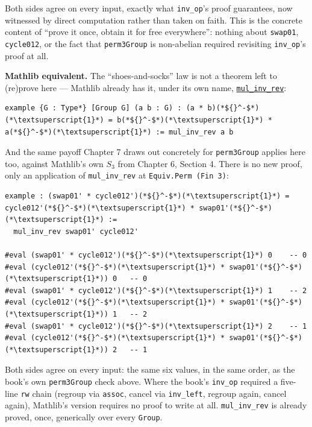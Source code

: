 Both sides agree on every input, exactly what \texttt{inv\_\allowbreak{}op}'s proof guarantees, now witnessed by direct computation rather than taken on faith. This is the concrete content of ``prove it once, obtain it for free everywhere'': nothing about \texttt{swap01}, \texttt{cycle012}, or the fact that \texttt{perm3Group} is non-abelian required revisiting \texttt{inv\_\allowbreak{}op}'s proof at all.

\textbf{Mathlib equivalent.} The ``shoes-and-socks'' law is not a theorem left to (re)prove here --- Mathlib already has it, under its own name, \href{https://loogle.lean-lang.org/?q=mul_inv_rev}{\texttt{mul\_\allowbreak{}inv\_\allowbreak{}rev}}:

\begin{lstlisting}
example {G : Type*} [Group G] (a b : G) : (a * b)(*${}^-$*)(*\textsuperscript{1}*) = b(*${}^-$*)(*\textsuperscript{1}*) * a(*${}^-$*)(*\textsuperscript{1}*) := mul_inv_rev a b
\end{lstlisting}

And the same payoff Chapter 7 draws out concretely for \texttt{perm3Group} applies here too, against Mathlib's own \(S_3\) from Chapter 6, Section 4. There is no new proof, only an application of \texttt{mul\_\allowbreak{}inv\_\allowbreak{}rev} at \texttt{Equiv.Perm (Fin 3)}:

\begin{lstlisting}
example : (swap01' * cycle012')(*${}^-$*)(*\textsuperscript{1}*) = cycle012'(*${}^-$*)(*\textsuperscript{1}*) * swap01'(*${}^-$*)(*\textsuperscript{1}*) :=
  mul_inv_rev swap01' cycle012'

#eval (swap01' * cycle012')(*${}^-$*)(*\textsuperscript{1}*) 0    -- 0
#eval (cycle012'(*${}^-$*)(*\textsuperscript{1}*) * swap01'(*${}^-$*)(*\textsuperscript{1}*)) 0   -- 0
#eval (swap01' * cycle012')(*${}^-$*)(*\textsuperscript{1}*) 1    -- 2
#eval (cycle012'(*${}^-$*)(*\textsuperscript{1}*) * swap01'(*${}^-$*)(*\textsuperscript{1}*)) 1   -- 2
#eval (swap01' * cycle012')(*${}^-$*)(*\textsuperscript{1}*) 2    -- 1
#eval (cycle012'(*${}^-$*)(*\textsuperscript{1}*) * swap01'(*${}^-$*)(*\textsuperscript{1}*)) 2   -- 1
\end{lstlisting}

Both sides agree on every input: the same six values, in the same order, as the book's own \texttt{perm3Group} check above. Where the book's \texttt{inv\_\allowbreak{}op} required a five-line \texttt{rw} chain (regroup via \texttt{assoc}, cancel via \texttt{inv\_\allowbreak{}left}, regroup again, cancel again), Mathlib's version requires no proof to write at all. \texttt{mul\_\allowbreak{}inv\_\allowbreak{}rev} is already proved, once, generically over every \texttt{Group}.
